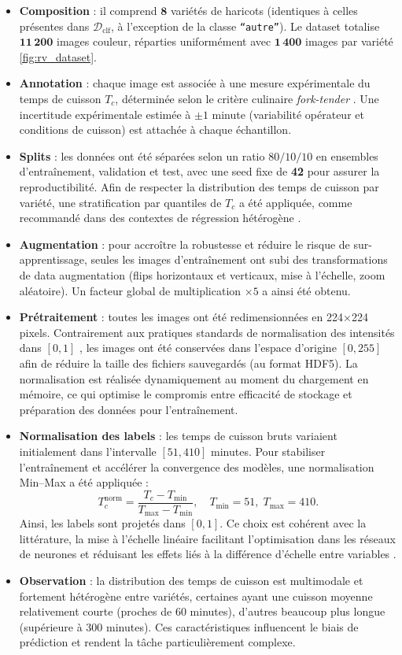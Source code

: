 \begin{itemize}
	\item \textbf{Composition} : il comprend \(\mathbf{8}\) variétés de haricots (identiques à celles présentes dans \(\mathcal{D}_{\text{clf}}\), à l’exception de la classe \texttt{``autre''}). Le dataset totalise \(\mathbf{11\,200}\) images couleur, réparties uniformément avec \(\mathbf{1\,400}\) images par variété \ref{fig:rv_dataset}.
	\item \textbf{Annotation} : chaque image est associée à une mesure expérimentale du temps de cuisson \(T_c\), déterminée selon le critère culinaire \emph{fork-tender} \cite{hall2017beanquality}. Une incertitude expérimentale estimée à \(\pm 1\) minute (variabilité opérateur et conditions de cuisson) est attachée à chaque échantillon.
	\item \textbf{Splits} : les données ont été séparées selon un ratio \(80/10/10\) en ensembles d’entraînement, validation et test, avec une seed fixe de \textbf{42} pour assurer la reproductibilité. Afin de respecter la distribution des temps de cuisson par variété, une stratification par quantiles de \(T_c\) a été appliquée, comme recommandé dans des contextes de régression hétérogène \cite{guyon2017analysis}.
	\item \textbf{Augmentation} : pour accroître la robustesse et réduire le risque de sur-apprentissage, seules les images d’entraînement ont subi des transformations de data augmentation (flips horizontaux et verticaux, mise à l’échelle, zoom aléatoire). Un facteur global de multiplication \(\times 5\) a ainsi été obtenu.
	\item \textbf{Prétraitement} : toutes les images ont été redimensionnées en 224×224 pixels. Contrairement aux pratiques standards de normalisation des intensités dans \([0,1]\) \cite{lecun2015deep}, les images ont été conservées dans l’espace d’origine \([0,255]\) afin de réduire la taille des fichiers sauvegardés (au format HDF5). La normalisation est réalisée dynamiquement au moment du chargement en mémoire, ce qui optimise le compromis entre efficacité de stockage et préparation des données pour l’entraînement.
	\item \textbf{Normalisation des labels} : les temps de cuisson bruts variaient initialement dans l’intervalle \([51, 410]\) minutes. Pour stabiliser l’entraînement et accélérer la convergence des modèles, une normalisation Min–Max a été appliquée  :
	      \[
		      T_c^{\text{norm}} = \frac{T_c - T_{\min}}{T_{\max} - T_{\min}}, \quad T_{\min} = 51, \; T_{\max} = 410.
	      \]
	      Ainsi, les labels sont projetés dans \([0,1]\). Ce choix est cohérent avec la littérature, la mise à l’échelle linéaire facilitant l’optimisation dans les réseaux de neurones et réduisant les effets liés à la différence d’échelle entre variables \cite{bishop2006pattern}.
	\item \textbf{Observation} : la distribution des temps de cuisson est multimodale et fortement hétérogène entre variétés, certaines ayant une cuisson moyenne relativement courte (proches de 60 minutes), d’autres beaucoup plus longue (supérieure à 300 minutes). Ces caractéristiques influencent le biais de prédiction et rendent la tâche particulièrement complexe.
\end{itemize}

